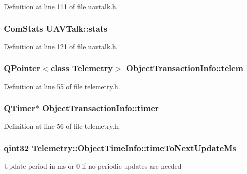 \-Definition at line 111 of file uavtalk.\-h.

\hypertarget{group___u_a_v_talk_plugin_ga35edebb70765f832afb1174152d4e20c}{
\subsubsection[{stats}]{\setlength{\rightskip}{0pt plus 5cm}\-Com\-Stats {\bf \-U\-A\-V\-Talk\-::stats}}}\label{group___u_a_v_talk_plugin_ga35edebb70765f832afb1174152d4e20c}


\-Definition at line 121 of file uavtalk.\-h.

\hypertarget{group___u_a_v_talk_plugin_ga1df77178093618626fe21d5bc58b03f4}{
\subsubsection[{telem}]{\setlength{\rightskip}{0pt plus 5cm}\-Q\-Pointer$<$class {\bf \-Telemetry}$>$ {\bf \-Object\-Transaction\-Info\-::telem}}}\label{group___u_a_v_talk_plugin_ga1df77178093618626fe21d5bc58b03f4}


\-Definition at line 55 of file telemetry.\-h.

\hypertarget{group___u_a_v_talk_plugin_gaf400de9c7d9b37a52e821b1a7bc6580e}{
\subsubsection[{timer}]{\setlength{\rightskip}{0pt plus 5cm}\-Q\-Timer$\ast$ {\bf \-Object\-Transaction\-Info\-::timer}}}\label{group___u_a_v_talk_plugin_gaf400de9c7d9b37a52e821b1a7bc6580e}


\-Definition at line 56 of file telemetry.\-h.

\hypertarget{group___u_a_v_talk_plugin_gad3f8bd7cd7ca82748573626dde1055af}{
\subsubsection[{time\-To\-Next\-Update\-Ms}]{\setlength{\rightskip}{0pt plus 5cm}qint32 \-Telemetry\-::\-Object\-Time\-Info\-::time\-To\-Next\-Update\-Ms}}\label{group___u_a_v_talk_plugin_gad3f8bd7cd7ca82748573626dde1055af}
\-Update period in ms or 0 if no periodic updates are needed 

